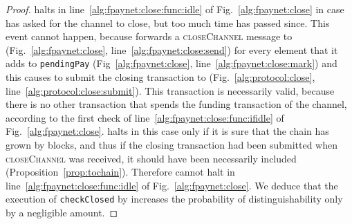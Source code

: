 \begin{proof}
  \fpaynet{} halts in line~\ref{alg:fpaynet:close:func:idle} of
  Fig.~\ref{alg:fpaynet:close} in case \environment{} has asked for the channel
  to close, but too much time has passed since. This event cannot happen,
  because \fpaynet{} forwards a \textsc{closeChannel} message to \simulator{}
  (Fig.~\ref{alg:fpaynet:close}, line~\ref{alg:fpaynet:close:send}) for every
  element that it adds to \texttt{pendingPay} (Fig~\ref{alg:fpaynet:close},
  line~\ref{alg:fpaynet:close:mark}) and this causes \simulator{} to submit the
  closing transaction to \ledger{} (Fig.~\ref{alg:protocol:close},
  line~\ref{alg:protocol:close:submit}). This transaction is necessarily valid,
  because there is no other transaction that spends the funding transaction of
  the channel, according to the first check of
  line~\ref{alg:fpaynet:close:func:ifidle} of Fig.~\ref{alg:fpaynet:close}.
  \fpaynet{} halts in this case only if it is sure that the chain has grown by
  \tochain{} blocks, and thus if the closing transaction had been submitted when
  \textsc{closeChannel} was received, it should have been necessarily included
  (Proposition~\ref{prop:tochain}). Therefore \fpaynet{} cannot halt in
  line~\ref{alg:fpaynet:close:func:idle} of Fig.~\ref{alg:fpaynet:close}. We
  deduce that the execution of \texttt{checkClosed} by \fpaynet{} increases the
  probability of distinguishability only by a negligible amount.
\end{proof}
